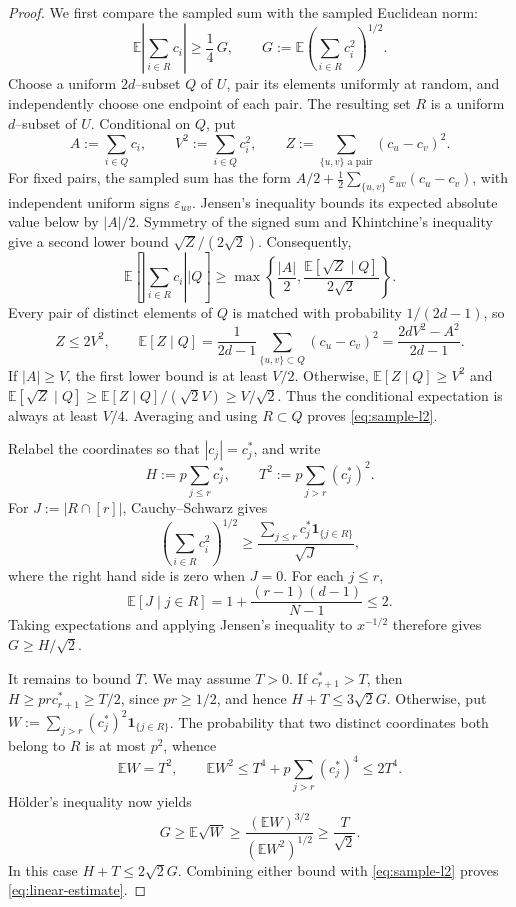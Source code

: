 \documentclass[reqno,english]{amsart}
\newcommand*{\EE}{\mathbb E}
\newcommand*{\ind}{\mathbf 1}
\theoremstyle{definition}
\begin{document}
\begin{proof}
{
We first compare the sampled sum with the sampled Euclidean norm:
\begin{equation}\label{eq:sample-l2}
 \EE\left|\sum_{i\in R}c_i\right|
 \ge\frac14\,G,
 \qquad
 G:=\EE\left(\sum_{i\in R}c_i^2\right)^{1/2}.
\end{equation}
Choose a uniform $2d$--subset $Q$ of $U$, pair its elements uniformly at
random, and independently choose one endpoint of each pair. The resulting
set $R$ is a uniform $d$--subset of $U$. Conditional on $Q$, put
\[
 A:=\sum_{i\in Q}c_i,\qquad V^2:=\sum_{i\in Q}c_i^2,
 \qquad Z:=\sum_{\{u,v\}\text{ a pair}}(c_u-c_v)^2.
\]
For fixed pairs, the sampled sum has the form
$A/2+\frac12\sum_{\{u,v\}}\varepsilon_{uv}(c_u-c_v)$, with independent
uniform signs $\varepsilon_{uv}$. Jensen's inequality bounds its expected
absolute value below by $|A|/2$. Symmetry of the signed sum and
Khintchine's inequality give a second lower bound $\sqrt Z/(2\sqrt2)$.
Consequently,
\[
 \EE\left[\left|\sum_{i\in R}c_i\right|\mathrel{\Big|}Q\right]
 \ge\max\left\{\frac{|A|}{2},
                 \frac{\EE[\sqrt Z\mid Q]}{2\sqrt2}\right\}.
\]
Every pair of distinct elements of $Q$ is matched with probability
$1/(2d-1)$, so
\[
 Z\le2V^2,
 \qquad
 \EE[Z\mid Q]
 =\frac{1}{2d-1}\sum_{\{u,v\}\subset Q}(c_u-c_v)^2
 =\frac{2dV^2-A^2}{2d-1}.
\]
If $|A|\ge V$, the first lower bound is at least $V/2$. Otherwise,
$\EE[Z\mid Q]\ge V^2$ and
$\EE[\sqrt Z\mid Q]\ge\EE[Z\mid Q]/(\sqrt2 V)\ge V/\sqrt2$.
Thus the conditional expectation is always at least $V/4$.
Averaging and using $R\subset Q$ proves \eqref{eq:sample-l2}.

Relabel the coordinates so that $|c_j|=c_j^*$, and write
\[
 H:=p\sum_{j\le r}c_j^*,
 \qquad T^2:=p\sum_{j>r}(c_j^*)^2.
\]
For $J:=|R\cap[r]|$, Cauchy--Schwarz gives
\[
 \left(\sum_{i\in R}c_i^2\right)^{1/2}
 \ge\frac{\sum_{j\le r}c_j^*\ind_{\{j\in R\}}}{\sqrt J},
\]
where the right hand side is zero when $J=0$. For each $j\le r$,
\[
 \EE[J\mid j\in R]
 =1+\frac{(r-1)(d-1)}{N-1}\le2.
\]
Taking expectations and applying Jensen's inequality to $x^{-1/2}$
therefore gives $G\ge H/\sqrt2$.

It remains to bound $T$. We may assume $T>0$. If $c_{r+1}^*>T$, then
$H\ge prc_{r+1}^*\ge T/2$, since $pr\ge1/2$, and hence
$H+T\le3\sqrt2G$. Otherwise, put
$W:=\sum_{j>r}(c_j^*)^2\ind_{\{j\in R\}}$. The probability that two
distinct coordinates both belong to $R$ is at most $p^2$, whence
\[
 \EE W=T^2,
 \qquad
 \EE W^2\le T^4+p\sum_{j>r}(c_j^*)^4\le2T^4.
\]
H\"older's inequality now yields
\[
 G\ge\EE\sqrt W
 \ge\frac{(\EE W)^{3/2}}{(\EE W^2)^{1/2}}
 \ge\frac{T}{\sqrt2}.
\]
In this case $H+T\le2\sqrt2G$. Combining either bound with
\eqref{eq:sample-l2} proves \eqref{eq:linear-estimate}.
}
\end{proof}
\end{document}
